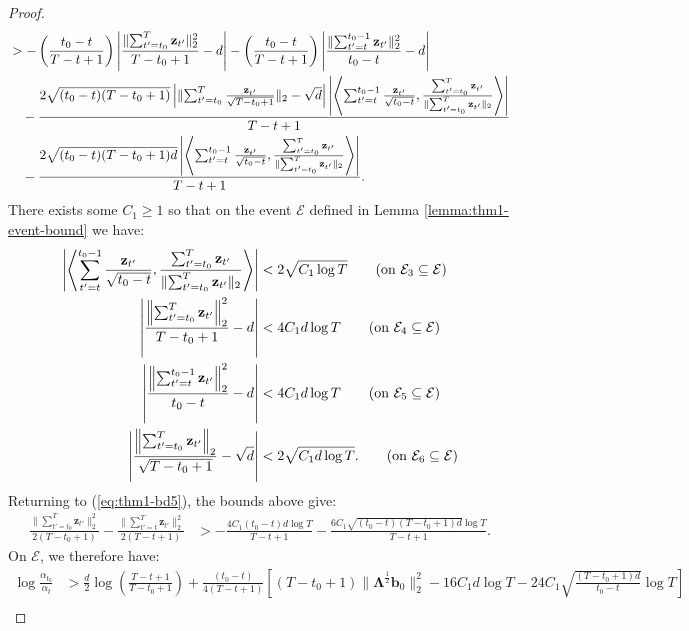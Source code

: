 \begin{proof}
\begin{align}
    &> -\left(\frac{t_0-t}{T-t+1}\right)\left|\frac{\lVert\sum_{t'=t_0}^T\mathbf{z}_{t'}\rVert_2^2}{T-t_0 + 1} - d\right| - \left(\frac{t_0-t}{T-t+1}\right)\left|\frac{\lVert\sum_{t'=t}^{t_0-1}\mathbf{z}_{t'}\rVert_2^2}{t_0-t} -d \right| \notag \\
    &\quad -\frac{2\sqrt{(t_0-t)(T-t_0+1)}\left|\lVert\sum_{t'=t_0}^{T}\frac{\mathbf{z}_{t'}}{\sqrt{T-t_0+1}}\rVert_2 -\sqrt{d}\right|\left|\left\langle \sum_{t'=t}^{t_0-1}\frac{\mathbf{z}_{t'}}{\sqrt{t_0-t}}, \frac{\sum_{t'=t_0}^{T}\mathbf{z}_{t'}}{\lVert\sum_{t'=t_0}^{T}\mathbf{z}_{t'}\rVert_2}\right\rangle\right|}{T-t+1} \notag \\
    &\quad-\frac{2\sqrt{(t_0-t)(T-t_0+1)d}\left|\left\langle \sum_{t'=t}^{t_0-1}\frac{\mathbf{z}_{t'}}{\sqrt{t_0-t}}, \frac{\sum_{t'=t_0}^T\mathbf{z}_{t'}}{\lVert\sum_{t'=t_0}^T\mathbf{z}_{t'}\rVert_2}\right\rangle\right|}{T-t+1}. \label{eq:thm1-bd5}
\end{align}
\normalsize
There exists some $C_1 \geq 1$ so that on the event $\mathcal{E}$ defined in Lemma \ref{lemma:thm1-event-bound} we have:
\begin{align*}
    \left|\left\langle \sum_{t'=t}^{t_0-1}\frac{\mathbf{z}_{t'}}{\sqrt{t_0-t}}, \frac{\sum_{t'=t_0}^{T}\mathbf{z}_{t'}}{\lVert\sum_{t'=t_0}^{T}\mathbf{z}_{t'}\rVert_2}\right\rangle\right| &< 2\sqrt{C_1\log T} \tag{on $\mathcal{E}_3\subseteq\mathcal{E}$} \\
    \left|\frac{\left\lVert\sum_{t'=t_0}^T\mathbf{z}_{t'}\right\rVert_2^2}{T-t_0+1} - d\right| &< 4C_1d\log T \tag{on $\mathcal{E}_4\subseteq\mathcal{E}$} \\
    \left|\frac{\left\lVert\sum_{t'=t}^{t_0-1}\mathbf{z}_{t'}\right\rVert_2^2}{t_0-t} - d\right| &< 4C_1d\log T \tag{on $\mathcal{E}_5\subseteq\mathcal{E}$} \\
    \left|\frac{\left\lVert\sum_{t'=t_0}^{T}\mathbf{z}_{t'}\right\rVert_2}{\sqrt{T-t_0+1}} -\sqrt{d}\right| &< 2\sqrt{C_1 d\log T}. \tag{on $\mathcal{E}_6\subseteq\mathcal{E}$} 
\end{align*}
Returning to (\ref{eq:thm1-bd5}), the bounds above give:
\begin{align*}
    \frac{\lVert\sum_{t'=t_0}^T\mathbf{z}_{t'}\rVert_2^2}{2(T-t_0+1)} - \frac{\lVert\sum_{t'=t}^T\mathbf{z}_{t'}\rVert_2^2}{2(T-t+1)} &> -\frac{4C_1(t_0-t)d\log T}{T-t+1} - \frac{6C_1\sqrt{(t_0-t)(T-t_0+1)d}\log T}{T-t+1}.
\end{align*}
On $\mathcal{E}$, we therefore have:
\begin{align*}
    \log \frac{\alpha_{t_0}}{\alpha_t} &> \frac{d}{2}\log\left(\frac{T-t+1}{T-t_0+1}\right) + \frac{(t_0 - t) }{4(T-t+1)}\left[(T-t_0+1)\lVert\boldsymbol{\Lambda}^{\frac{1}{2}} \mathbf{b}_0\rVert^2_2 -16C_1d\log T - 24C_1\sqrt{\frac{(T-t_0+1)d}{t_0-t}}\log T\right] \\

\end{align*}
\end{proof}
